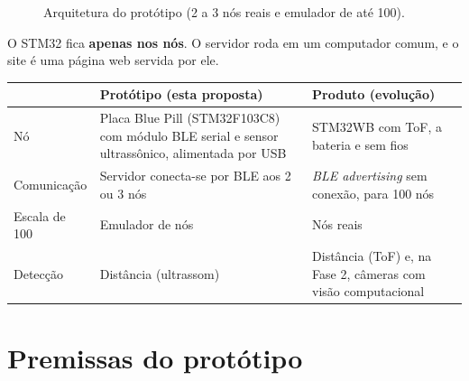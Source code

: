 \documentclass[11pt,a4paper]{article}
\begin{document}
\begin{figure}[h]
\centering
{}
\caption{Arquitetura do protótipo (2 a 3 nós reais e emulador de até 100).}
\end{figure}

O STM32 fica \textbf{apenas nos nós}. O servidor roda em um computador comum,
e o site é uma página web servida por ele.

\begin{longtable}{|L{3.2cm}|L{5.6cm}|L{5.6cm}|}
\hline
 & \textbf{Protótipo (esta proposta)} & \textbf{Produto (evolução)} \\ \hline
Nó & Placa Blue Pill (STM32F103C8) com módulo BLE serial e sensor ultrassônico, alimentada por USB & STM32WB com ToF, a bateria e sem fios \\ \hline
Comunicação & Servidor conecta-se por BLE aos 2 ou 3 nós & \emph{BLE advertising} sem conexão, para 100 nós \\ \hline
Escala de 100 & Emulador de nós & Nós reais \\ \hline
Detecção & Distância (ultrassom) & Distância (ToF) e, na Fase 2, câmeras com visão computacional \\ \hline
\end{longtable}

\section{Premissas do protótipo}
\end{document}
